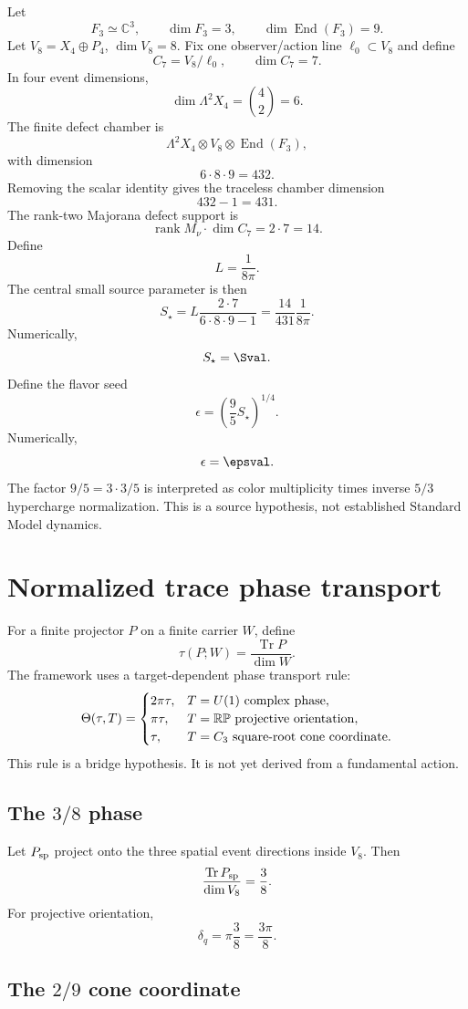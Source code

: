 \documentclass[11pt]{article}
\newcommand{\status}[1]{\textsf{#1}}
\newcommand{\bridge}{\status{bridge hypothesis}}
\newcommand{\End}{\operatorname{End}}
\newcommand{\rank}{\operatorname{rank}}
\newcommand{\Tr}{\operatorname{Tr}}
\begin{document}
Let
\[
F_3\simeq\mathbb C^3,\qquad \dim F_3=3,\qquad
\dim\End(F_3)=9.
\]
Let \(V_8=X_4\oplus P_4\), \(\dim V_8=8\). Fix one observer/action line \(\ell_0\subset V_8\) and define
\[
C_7=V_8/\ell_0,\qquad \dim C_7=7.
\]
In four event dimensions,
\[
\dim\Lambda^2X_4=\binom42=6.
\]
The finite defect chamber is
\[
\Lambda^2X_4\otimes V_8\otimes \End(F_3),
\]
with dimension
\[
6\cdot8\cdot9=432.
\]
Removing the scalar identity gives the traceless chamber dimension
\[
432-1=431.
\]
The rank-two Majorana defect support is
\[
\rank M_\nu\cdot \dim C_7=2\cdot7=14.
\]
Define
\[
L=\frac1{8\pi}.
\]
The central small source parameter is then
\[
\boxed{
S_\star=
L\frac{2\cdot7}{6\cdot8\cdot9-1}
=
\frac{14}{431}\frac1{8\pi}.
}
\]
Numerically,
\[
S_\star=\Sval.
\]
Define the flavor seed
\[
\boxed{
\epsilon=\left(\frac95S_\star\right)^{1/4}.
}
\]
Numerically,
\[
\epsilon=\epsval.
\]
The factor \(9/5=3\cdot 3/5\) is interpreted as color multiplicity times inverse \(5/3\) hypercharge normalization. This is a source hypothesis, not established Standard Model dynamics.

\section{Normalized trace phase transport}

For a finite projector \(P\) on a finite carrier \(W\), define
\[
\tau(P;W)=\frac{\Tr P}{\dim W}.
\]
The framework uses a target-dependent phase transport rule:
\[
\Theta(\tau,T)=
\begin{cases}
2\pi\tau,& T=U(1)\ {\rm complex\ phase},\\
\pi\tau,& T=\mathbb{RP}\ {\rm projective\ orientation},\\
\tau,& T=C_3\ {\rm square\mbox{-}root\ cone\ coordinate}.
\end{cases}
\]
This rule is a \bridge. It is not yet derived from a fundamental action.

\subsection{The \(3/8\) phase}

Let \(P_{\rm sp}\) project onto the three spatial event directions inside \(V_8\). Then
\[
\frac{\Tr P_{\rm sp}}{\dim V_8}=\frac38.
\]
For projective orientation,
\[
\delta_q=\pi\frac38=\frac{3\pi}{8}.
\]

\subsection{The \(2/9\) cone coordinate}
\end{document}
